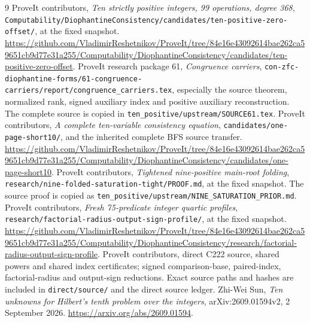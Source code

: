 \documentclass[11pt]{article}
\theoremstyle{remark}\newtheorem{remark}[theorem]{Remark}
\newcommand{\file}[1]{{\small\nolinkurl{#1}}}
\begin{document}
\begin{thebibliography}{9}
ProveIt contributors, \emph{Ten strictly positive integers, 99 operations,
degree 368}, \file{Computability/DiophantineConsistency/candidates/ten-positive-zero-offset/},
at the fixed snapshot. \url{https://github.com/VladimirReshetnikov/ProveIt/tree/84e16e43092614bae262ca59651cb9d77e31a255/Computability/DiophantineConsistency/candidates/ten-positive-zero-offset}.
ProveIt research package 61, \emph{Congruence carriers},
\file{con-zfc-diophantine-forms/61-congruence-carriers/report/congruence_carriers.tex},
especially the source theorem, normalized rank, signed auxiliary index and
positive auxiliary reconstruction. The complete source is copied in
\file{ten_positive/upstream/SOURCE61.tex}.
ProveIt contributors, \emph{A complete ten-variable consistency equation},
\file{candidates/one-page-short10/}, and the inherited complete BFS source
transfer. \url{https://github.com/VladimirReshetnikov/ProveIt/tree/84e16e43092614bae262ca59651cb9d77e31a255/Computability/DiophantineConsistency/candidates/one-page-short10}.
ProveIt contributors, \emph{Tightened nine-positive main-root folding},
\file{research/nine-folded-saturation-tight/PROOF.md}, at the fixed snapshot.
The source proof is copied as \file{ten_positive/upstream/NINE_SATURATION_PRIOR.md}.
ProveIt contributors, \emph{Fresh 75-predicate integer quartic profiles},
\file{research/factorial-radius-output-sign-profile/}, at the fixed snapshot.
\url{https://github.com/VladimirReshetnikov/ProveIt/tree/84e16e43092614bae262ca59651cb9d77e31a255/Computability/DiophantineConsistency/research/factorial-radius-output-sign-profile}.
ProveIt contributors, direct C222 source, shared powers and shared index
certificates; signed comparison-base, paired-index, factorial-radius and
output-sign reductions. Exact source paths and hashes are included in
\file{direct/source/} and the direct source ledger.
Zhi-Wei Sun, \emph{Ten unknowns for Hilbert's tenth problem over the integers},
arXiv:2609.01594v2, 2 September 2026.
\url{https://arxiv.org/abs/2609.01594}.
\end{thebibliography}
\end{document}
